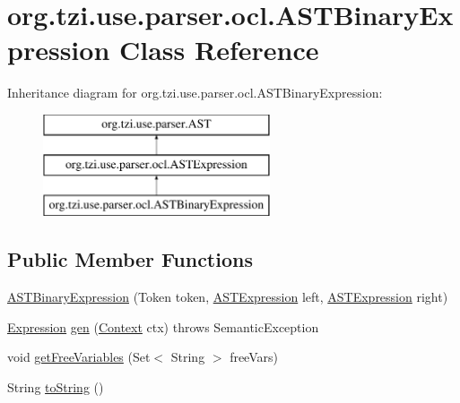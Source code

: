 \hypertarget{classorg_1_1tzi_1_1use_1_1parser_1_1ocl_1_1_a_s_t_binary_expression}{\section{org.\-tzi.\-use.\-parser.\-ocl.\-A\-S\-T\-Binary\-Expression Class Reference}
\label{classorg_1_1tzi_1_1use_1_1parser_1_1ocl_1_1_a_s_t_binary_expression}
}
Inheritance diagram for org.\-tzi.\-use.\-parser.\-ocl.\-A\-S\-T\-Binary\-Expression\-:\begin{figure}[H]
\begin{center}
\leavevmode
\includegraphics[height=3.000000cm]{classorg_1_1tzi_1_1use_1_1parser_1_1ocl_1_1_a_s_t_binary_expression}
\end{center}
\end{figure}
\subsection*{Public Member Functions}
\begin{DoxyCompactItemize}
\item 
\hyperlink{classorg_1_1tzi_1_1use_1_1parser_1_1ocl_1_1_a_s_t_binary_expression_ab08bebaa1027b7b96508a8bf6d30c2f3}{A\-S\-T\-Binary\-Expression} (Token token, \hyperlink{classorg_1_1tzi_1_1use_1_1parser_1_1ocl_1_1_a_s_t_expression}{A\-S\-T\-Expression} left, \hyperlink{classorg_1_1tzi_1_1use_1_1parser_1_1ocl_1_1_a_s_t_expression}{A\-S\-T\-Expression} right)
\item 
\hyperlink{classorg_1_1tzi_1_1use_1_1uml_1_1ocl_1_1expr_1_1_expression}{Expression} \hyperlink{classorg_1_1tzi_1_1use_1_1parser_1_1ocl_1_1_a_s_t_binary_expression_a2eae98f339b8b82b5d62b9ccc8e3d231}{gen} (\hyperlink{classorg_1_1tzi_1_1use_1_1parser_1_1_context}{Context} ctx)  throws Semantic\-Exception 
\item 
void \hyperlink{classorg_1_1tzi_1_1use_1_1parser_1_1ocl_1_1_a_s_t_binary_expression_ad976e9b132d38a1f9c31b3ca28074703}{get\-Free\-Variables} (Set$<$ String $>$ free\-Vars)
\item 
String \hyperlink{classorg_1_1tzi_1_1use_1_1parser_1_1ocl_1_1_a_s_t_binary_expression_aa6499d81806f21ce3b9031b446e402ad}{to\-String} ()
\end{DoxyCompactItemize}
